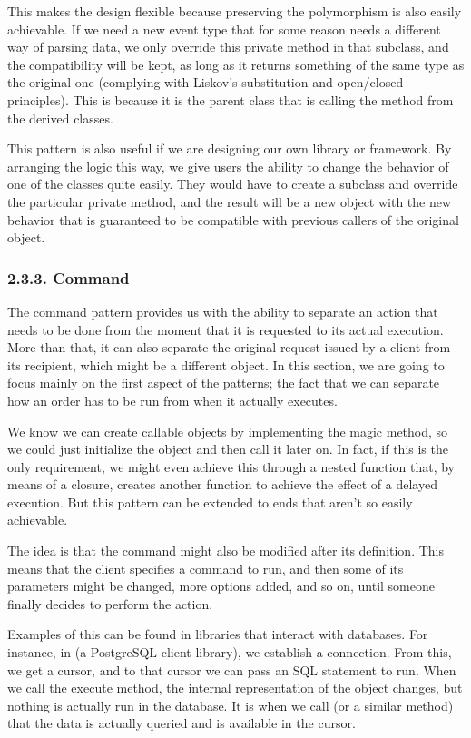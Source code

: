 \documentclass[a4paper,10pt,english]{sphinxmanual}
\begin{document}
This makes the design flexible because preserving the polymorphism is also easily
achievable. If we need a new event type that for some reason needs a different way of
parsing data, we only override this private method in that subclass, and the compatibility
will be kept, as long as it returns something of the same type as the original one (complying
with Liskov’s substitution and open/closed principles). This is because it is the parent class
that is calling the method from the derived classes.

This pattern is also useful if we are designing our own library or framework. By arranging
the logic this way, we give users the ability to change the behavior of one of the classes
quite easily. They would have to create a subclass and override the particular private
method, and the result will be a new object with the new behavior that is guaranteed to be
compatible with previous callers of the original object.


\subsubsection{2.3.3. Command}
\label{\detokenize{chapters/9_design_patterns/index:command}}
The command pattern provides us with the ability to separate an action that needs to be
done from the moment that it is requested to its actual execution. More than that, it can also
separate the original request issued by a client from its recipient, which might be a different
object. In this section, we are going to focus mainly on the first aspect of the patterns; the
fact that we can separate how an order has to be run from when it actually executes.

We know we can create callable objects by implementing the  magic method,
so we could just initialize the object and then call it later on. In fact, if this is the only
requirement, we might even achieve this through a nested function that, by means of a
closure, creates another function to achieve the effect of a delayed execution. But this
pattern can be extended to ends that aren’t so easily achievable.

The idea is that the command might also be modified after its definition. This means that
the client specifies a command to run, and then some of its parameters might be changed,
more options added, and so on, until someone finally decides to perform the action.

Examples of this can be found in libraries that interact with databases. For instance,
in  (a PostgreSQL client library), we establish a connection. From this, we get a
cursor, and to that cursor we can pass an SQL statement to run. When we call the execute
method, the internal representation of the object changes, but nothing is actually run in the
database. It is when we call  (or a similar method) that the data is actually
queried and is available in the cursor.
\end{document}
